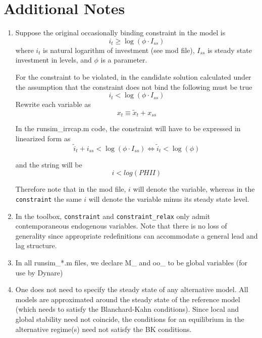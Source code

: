 \documentclass[12pt]{article}
\begin{document}
\section{Additional Notes}

\begin{enumerate}
\item Suppose the original occasionally binding constraint in the model is 
\begin{equation*}
i_{t}\geq \log \left( \phi \cdot I_{ss}\right)
\end{equation*}%
where $i_{t}$ is natural logarithm of investment (see mod file), $I_{ss}$ is
steady state investment in levels, and $\phi $ is a parameter.

For the constraint to be violated, in the candidate solution calculated
under the assumption that the constraint does not bind the following must be
true%
\begin{equation*}
i_{t}<\log \left( \phi \cdot I_{ss}\right)
\end{equation*}%
Rewrite each variable as%
\begin{equation*}
x_{t}\equiv \widetilde{x}_{t}+x_{ss}
\end{equation*}

In the runsim\_irrcap.m code, the constraint will have to be expressed in
linearized form as%
\begin{equation*}
\widetilde{i}_{t}+i_{ss}<\log \left( \phi \cdot I_{ss}\right)
\Longleftrightarrow \widetilde{i}_{t}<\log \left( \phi \right)
\end{equation*}

and the string will be 
\begin{equation*}
i<log(PHII)
\end{equation*}

Therefore note that in the mod file, $i$ will denote the variable, whereas
in the \texttt{constraint} the same $i$ will denote the variable minus its
steady state level.

\item In the toolbox, \texttt{constraint} and \texttt{constraint\_relax}
only admit contemporaneous endogenous variables. Note that there is 
no loss of generality since appropriate redefinitions can accommodate a
general lead and lag structure.

\item In all runsim\_*.m files, we declare M\_ and oo\_ to be global
variables (for use by Dynare)

\item One does not need to specify the steady state of any alternative
model. All models are approximated around the steady state of the
reference model (which needs to satisfy the Blanchard-Kahn conditions). Since local and global stability need not coincide, the conditions for an equilibrium in the alternative regime(s) need not satisfy the BK conditions.


\end{enumerate}
\end{document}
